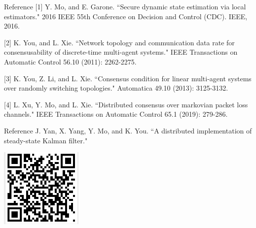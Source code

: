\documentclass[10pt]{beamer}
\DeclareMathOperator{\1}{\textbf{1}}
\begin{document}
	      \begin{frame}{Reference}
		\footnotesize [1] Y. Mo, and E. Garone. ``Secure dynamic state estimation via local estimators." 2016 IEEE 55th Conference on Decision and Control (CDC). IEEE, 2016.

		[2] K. You, and L. Xie. ``Network topology and communication data rate for consensusability of discrete-time multi-agent systems." IEEE Transactions on Automatic Control 56.10 (2011): 2262-2275.

		[3] K. You, Z. Li, and L. Xie. ``Consensus condition for linear multi-agent systems over randomly switching topologies." Automatica 49.10 (2013): 3125-3132.

		[4] L. Xu, Y. Mo, and L. Xie. ``Distributed consensus over markovian packet loss channels." IEEE Transactions on Automatic Control 65.1 (2019): 279-286.
	      \end{frame}

	      \begin{frame}{Reference}
		J. Yan, X. Yang, Y. Mo, and K. You. ``A distributed implementation of steady-state Kalman filter." 

		\vspace{10pt}
		\centering
		\includegraphics[width=0.3\textwidth]{pic/qr.jpeg}
	      \end{frame}
\end{document}
